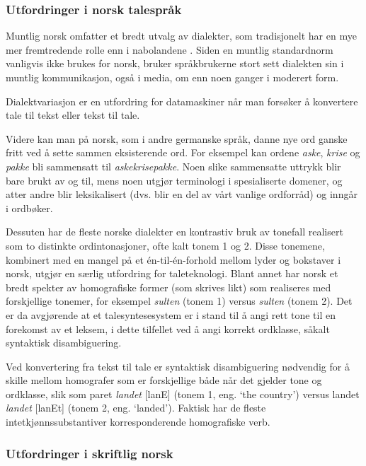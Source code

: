 \begin{multicols}{2}
\subsubsection{Utfordringer i norsk talespråk}
Muntlig norsk omfatter et bredt utvalg av dialekter, som tradisjonelt har en mye mer fremtredende rolle enn i nabolandene \cite{stm35:2008}.
Siden en muntlig standardnorm vanligvis ikke brukes for norsk, bruker språkbrukerne stort sett dialekten sin i muntlig kommunikasjon, også i media, om enn noen ganger i moderert form. 

Dialektvariasjon er en utfordring for datamaskiner når man forsøker å konvertere tale til tekst eller tekst til tale.


Videre kan man på norsk, som i andre germanske språk, danne nye ord ganske fritt ved å sette sammen eksisterende ord. For eksempel kan ordene \textit{aske}, \textit{krise} og \textit{pakke} bli sammensatt til \textit{askekrisepakke}.
Noen slike sammensatte uttrykk blir bare brukt av og til, mens noen utgjør terminologi i spesialiserte domener, og atter andre blir leksikalisert (dvs. blir en del av vårt vanlige ordforråd) og inngår i ordbøker.

Dessuten har de fleste norske dialekter en kontrastiv bruk av tonefall realisert som to distinkte ordintonasjoner, ofte kalt tonem 1 og 2. Disse tonemene, kombinert med en mangel på et én-til-én-forhold mellom lyder og bokstaver i norsk, utgjør en særlig utfordring for taleteknologi. Blant annet har norsk et bredt spekter av homografiske former (som skrives likt) som realiseres med forskjellige tonemer, for eksempel  \textit{sulten} (tonem 1) versus \textit{sulten} (tonem 2). Det er da avgjørende at et talesyntesesystem er i stand til å angi rett tone til en forekomst av et leksem, i dette tilfellet ved å angi korrekt ordklasse, såkalt syntaktisk disambiguering. 

Ved konvertering fra tekst til tale er syntaktisk disambiguering nødvendig for å skille mellom homografer som er forskjellige både når det gjelder tone og ordklasse, slik som paret \textit{landet} {[}lanE{]} (tonem 1, eng. `the country') versus landet \textit{landet} {[}lanEt{]} (tonem 2, eng. `landed'). 
Faktisk har de fleste intetkjønnssubstantiver korresponderende homografiske verb.

\subsubsection{Utfordringer i skriftlig norsk}


\end{multicols}
